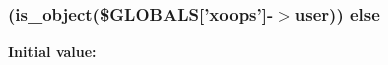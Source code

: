 \hypertarget{xortify_2post_8loader_8php_a05d5dfb2e997e7b1230ef56d742eb6c1}{
\subsubsection[{else}]{ (is\-\_\-object(\$G\-L\-O\-B\-A\-L\-S\mbox{[}'xoops'\mbox{]}-\/$>$user)) else}}\label{xortify_2post_8loader_8php_a05d5dfb2e997e7b1230ef56d742eb6c1}
{\bfseries Initial value\-:}
